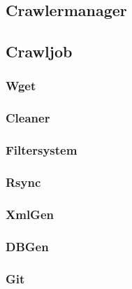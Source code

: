 \subsection{Crawlermanager}
\label{sub:crawlermanager}



\subsection{Crawljob}
\label{sub:crawljob}


\subsubsection{Wget}
\label{ssub:wget}

\subsubsection{Cleaner}
\label{ssub:cleaner}


\subsubsection{Filtersystem}
\label{ssub:filtersystem}


\subsubsection{Rsync}
\label{ssub:rsync}

\subsubsection{XmlGen}
\label{ssub:xmlgen}


\subsubsection{DBGen}
\label{ssub:dbgen}



\subsubsection{Git}
\label{ssub:git}



